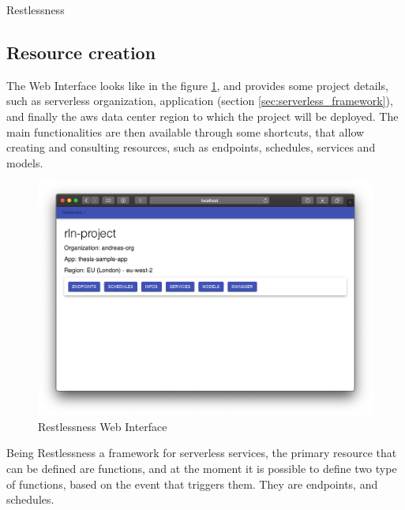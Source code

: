 \begin{chapter}{Restlessness}
    \subsection{Resource creation}
    The Web Interface looks like in the figure \ref{fig:rln_web_interface}, and
    provides some project details, such as serverless organization, application
    (section \ref{sec:serverless_framework}), and finally the aws data center
    region to which the project will be deployed.
    The main functionalities are then available through some shortcuts, that allow
    creating and consulting resources, such as endpoints, schedules, services and
    models.

    \begin{figure}
        \centering
        \includegraphics[width=\linewidth]{source/images/rln-web-interface.png}
        \caption{Restlessness Web Interface}
        \label{fig:rln_web_interface}
    \end{figure}

    Being Restlessness a framework for serverless services, the primary resource
    that can be defined are functions, and at the moment it is possible to define
    two type of functions, based on the event that triggers them. They are endpoints,
    and schedules.


\end{chapter}
